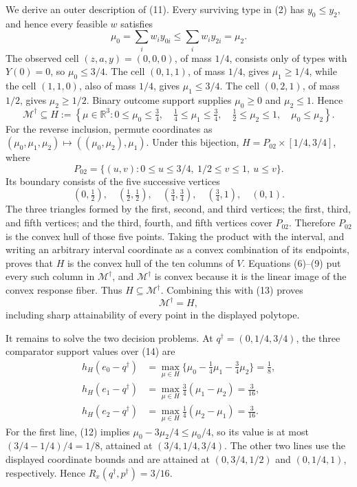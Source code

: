 We derive an outer description of (11).  Every surviving type in (2) has \(y_0\leq y_2\), and hence every feasible \(w\) satisfies
\[
 \mu_0=\sum_iw_i y_{0i}\leq\sum_iw_i y_{2i}=\mu_2.
 \tag{12}
\]
The observed cell \((z,a,y)=(0,0,0)\), of mass \(1/4\), consists only of types with \(Y(0)=0\), so \(\mu_0\leq3/4\).  The cell \((0,1,1)\), of mass \(1/4\), gives \(\mu_1\geq1/4\), while the cell \((1,1,0)\), also of mass \(1/4\), gives \(\mu_1\leq3/4\).  The cell \((0,2,1)\), of mass \(1/2\), gives \(\mu_2\geq1/2\).  Binary outcome support supplies \(\mu_0\geq0\) and \(\mu_2\leq1\).  Hence
\[
 \mathcal M^\dagger\subseteq H:=
 \left\{\mu\in\mathbb R^3:
 0\leq\mu_0\leq\tfrac34,\quad
 \tfrac14\leq\mu_1\leq\tfrac34,\quad
 \tfrac12\leq\mu_2\leq1,\quad
 \mu_0\leq\mu_2\right\}.
 \tag{13}
\]
For the reverse inclusion, permute coordinates as
\((\mu_0,\mu_1,\mu_2)\mapsto((\mu_0,\mu_2),\mu_1)\).  Under this bijection,
\(H=P_{02}\times[1/4,3/4]\), where
\[
P_{02}=\{(u,v):0\leq u\leq3/4,\ 1/2\leq v\leq1,\ u\leq v\}.
\]
Its boundary consists of the five successive vertices
\[
 (0,\tfrac12),\quad(\tfrac12,\tfrac12),\quad
 (\tfrac34,\tfrac34),\quad(\tfrac34,1),\quad(0,1).
\]
The three triangles formed by the first, second, and third vertices; the first, third, and fifth vertices; and the third, fourth, and fifth vertices cover \(P_{02}\).  Therefore \(P_{02}\) is the convex hull of those five points.  Taking the product with the interval, and writing an arbitrary interval coordinate as a convex combination of its endpoints, proves that \(H\) is the convex hull of the ten columns of \(V\).  Equations (6)--(9) put every such column in \(\mathcal M^\dagger\), and \(\mathcal M^\dagger\) is convex because it is the linear image of the convex response fiber.  Thus \(H\subseteq\mathcal M^\dagger\).  Combining this with (13) proves
\[
 \mathcal M^\dagger=H,
 \tag{14}
\]
including sharp attainability of every point in the displayed polytope.

It remains to solve the two decision problems.  At \(q^\dagger=(0,1/4,3/4)\), the three comparator support values over (14) are
\[
\begin{aligned}
h_H(e_0-q^\dagger)
 &=\max_{\mu\in H}\{\mu_0-\tfrac14\mu_1-\tfrac34\mu_2\}=\tfrac18,\\
h_H(e_1-q^\dagger)
 &=\max_{\mu\in H}\tfrac34(\mu_1-\mu_2)=\tfrac3{16},\\
h_H(e_2-q^\dagger)
 &=\max_{\mu\in H}\tfrac14(\mu_2-\mu_1)=\tfrac3{16}.
\end{aligned}
\tag{15}
\]
For the first line, (12) implies \(\mu_0-3\mu_2/4\leq\mu_0/4\), so its value is at most \((3/4-1/4)/4=1/8\), attained at \((3/4,1/4,3/4)\).  The other two lines use the displayed coordinate bounds and are attained at \((0,3/4,1/2)\) and \((0,1/4,1)\), respectively.  Hence \(R_x(q^\dagger,p^\dagger)=3/16\).

